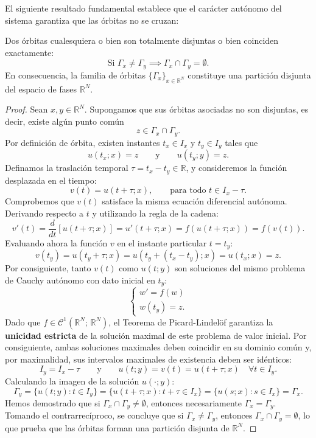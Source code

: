 El siguiente resultado fundamental establece que el carácter autónomo del sistema garantiza que las órbitas no se cruzan:

\begin{proposición}
    Dos órbitas cualesquiera o bien son totalmente disjuntas o bien coinciden exactamente:
    \[
        \text{Si } \Gamma_x \neq \Gamma_y \implies \Gamma_x \cap \Gamma_y = \emptyset.
    \]
    En consecuencia, la familia de órbitas $\{ \Gamma_x \}_{x \in \mathbb{R}^N}$ constituye una partición disjunta del espacio de fases $\mathbb{R}^N$.
\end{proposición}

\begin{proof}
    Sean $x, y \in \mathbb{R}^N$. Supongamos que sus órbitas asociadas no son disjuntas, es decir, existe algún punto común
    \[
        z \in \Gamma_x \cap \Gamma_y.
    \]
    Por definición de órbita, existen instantes $t_x \in I_x$ y $t_y \in I_y$ tales que
    \[
        u(t_x; x) = z \qquad \text{y} \qquad u(t_y; y) = z.
    \]
    Definamos la traslación temporal $\tau = t_x - t_y \in \mathbb{R}$, y consideremos la función desplazada en el tiempo:
    \[
        v(t) = u(t + \tau; x), \qquad \text{para todo } t \in I_x - \tau.
    \]
    Comprobemos que $v(t)$ satisface la misma ecuación diferencial autónoma. Derivando respecto a $t$ y utilizando la regla de la cadena:
    \[
        v'(t) = \frac{d}{dt}\left[ u(t + \tau; x) \right] = u'(t + \tau; x) = f(u(t + \tau; x)) = f(v(t)).
    \]
    Evaluando ahora la función $v$ en el instante particular $t = t_y$:
    \[
        v(t_y) = u(t_y + \tau; x) = u(t_y + (t_x - t_y); x) = u(t_x; x) = z.
    \]
    Por consiguiente, tanto $v(t)$ como $u(t; y)$ son soluciones del mismo problema de Cauchy autónomo con dato inicial en $t_y$:
    \[
        \begin{cases}
            w' = f(w) \\
            w(t_y) = z.
        \end{cases}
    \]
    Dado que $f \in \mathcal{C}^1(\mathbb{R}^N; \, \mathbb{R}^N)$, el Teorema de Picard-Lindelöf garantiza la \textbf{unicidad estricta} de la solución maximal de este problema de valor inicial. Por consiguiente, ambas soluciones maximales deben coincidir en su dominio común y, por maximalidad, sus intervalos maximales de existencia deben ser idénticos:
    \[
        I_y = I_x - \tau \qquad \text{y} \qquad u(t; y) = v(t) = u(t + \tau; x) \quad \forall t \in I_y.
    \]
    Calculando la imagen de la solución $u(\cdot; y)$:
    \[
        \Gamma_y = \{ u(t; y) : t \in I_y \} = \{ u(t + \tau; x) : t + \tau \in I_x \} = \{ u(s; x) : s \in I_x \} = \Gamma_x.
    \]
    Hemos demostrado que si $\Gamma_x \cap \Gamma_y \neq \emptyset$, entonces necesariamente $\Gamma_x = \Gamma_y$. Tomando el contrarrecíproco, se concluye que si $\Gamma_x \neq \Gamma_y$, entonces $\Gamma_x \cap \Gamma_y = \emptyset$, lo que prueba que las órbitas forman una partición disjunta de $\mathbb{R}^N$.
\end{proof}
